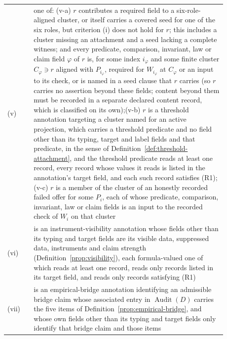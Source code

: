 \documentclass[11pt]{article}
\theoremstyle{definition}
\newcommand{\Audit}[1]{\ensuremath{\operatorname{Audit}\!\left(#1\right)}}
\begin{document}
\begin{longtable}{@{}l>{\raggedright\arraybackslash}p{0.88\linewidth}@{}}
(v) & one of: (v-a) \(r\) contributes a required field to a six-role-aligned cluster, or itself carries a covered seed for one of the six roles, but criterion (i) does not hold for \(r\); this includes a cluster missing an attachment and a seed lacking a complete witness; and every predicate, comparison, invariant, law or claim field \(\varphi\) of \(r\) is, for some index \(i_\varphi\) and some finite cluster \(C_\varphi\ni r\) aligned with \(P_{i_\varphi}\), required for \(W_{i_\varphi}\) at \(C_\varphi\) or an input to its check, or is named in a seed clause that \(r\) carries (so \(r\) carries no assertion beyond these fields; content beyond them must be recorded in a separate declared content record, which is classified on its own);\newline (v-b) \(r\) is a threshold annotation targeting a cluster named for an active projection, which carries a threshold predicate and no field other than its typing, target and label fields and that predicate, in the sense of Definition~\ref{def:threshold-attachment}, and the threshold predicate reads at least one record, every record whose values it reads is listed in the annotation's target field, and each such record satisfies (R1);\newline (v-c) \(r\) is a member of the cluster of an honestly recorded failed offer for some \(P_i\), each of whose predicate, comparison, invariant, law or claim fields is an input to the recorded check of \(W_i\) on that cluster \\
(vi) & is an instrument-visibility annotation whose fields other than its typing and target fields are its visible data, suppressed data, instruments and claim strength (Definition~\ref{prop:visibility}), each formula-valued one of which reads at least one record, reads only records listed in its target field, and reads only records satisfying (R1) \\
(vii) & is an empirical-bridge annotation identifying an admissible bridge claim whose associated entry in \(\Audit{D}\) carries the five items of Definition~\ref{prop:empirical-bridge}, and whose own fields other than its typing and target fields only identify that bridge claim and those items \\

\end{longtable}
\end{document}
